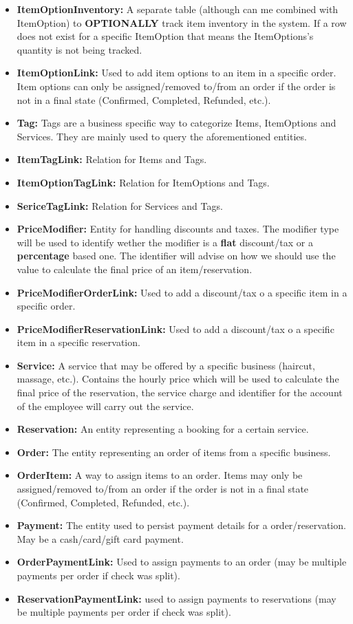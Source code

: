 \documentclass[11pt,a4paper,pdftex]{article}
\begin{document}
\begin{itemize}
    \item \textbf{ItemOptionInventory:} A separate table (although can me combined with ItemOption) to \textbf{OPTIONALLY} track item inventory in the system. If a row does not exist for a specific ItemOption that means the ItemOptions's quantity is not being tracked.
    \item \textbf{ItemOptionLink:} Used to add item options to an item in a specific order. Item options can only be assigned/removed to/from an order if the order is not in a final state (Confirmed, Completed, Refunded, etc.).
    \item \textbf{Tag:} Tags are a business specific way to categorize Items, ItemOptions and Services. They are mainly used to query the aforementioned entities.
    \item \textbf{ItemTagLink:} Relation for Items and Tags.
    \item \textbf{ItemOptionTagLink:} Relation for ItemOptions and Tags.
    \item \textbf{SericeTagLink:} Relation for Services and Tags.
    \item \textbf{PriceModifier:} Entity for handling discounts and taxes. The modifier type will be used to identify wether the modifier is a \textbf{flat} discount/tax or a \textbf{percentage} based one. The identifier will advise on how we should use the value to calculate the final price of an item/reservation.
    \item \textbf{PriceModifierOrderLink:} Used to add a discount/tax o a specific item in a specific order.
    \item \textbf{PriceModifierReservationLink:} Used to add a discount/tax o a specific item in a specific reservation.
    \item \textbf{Service:} A service that may be offered by a specific business (haircut, massage, etc.). Contains the hourly price which will be used to calculate the final price of the reservation, the service charge and identifier for the account of the employee will carry out the service.
    \item \textbf{Reservation:} An entity representing a booking for a certain service.
    \item \textbf{Order:} The entity representing an order of items from a specific business.
    \item \textbf{OrderItem:} A way to assign items to an order. Items may only be assigned/removed to/from an order if the order is not in a final state (Confirmed, Completed, Refunded, etc.).
    \item \textbf{Payment:} The entity used to persist payment details for a order/reservation. May be a cash/card/gift card payment.
    \item \textbf{OrderPaymentLink:} Used to assign payments to an order (may be multiple payments per order if check was split).
    \item \textbf{ReservationPaymentLink:} used to assign payments to reservations (may be multiple payments per order if check was split).
\end{itemize}
\end{document}
